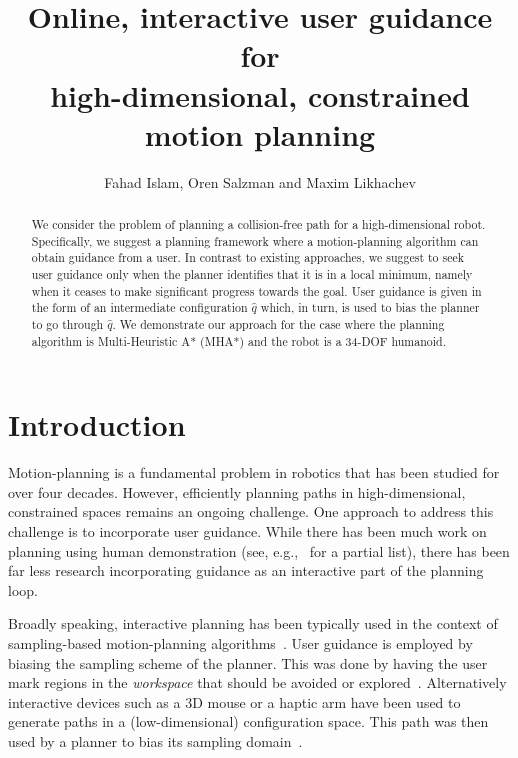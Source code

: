 \documentclass[conference]{IEEEtran}
\begin{document}
\title{	Online, interactive user guidance for \\
		high-dimensional, constrained motion planning }

\author{Fahad Islam, Oren Salzman and Maxim Likhachev}


\maketitle
\thispagestyle{empty}
\pagestyle{empty}



\begin{abstract}
We consider the problem of planning a collision-free path for a high-dimensional robot.
Specifically, we suggest a planning framework where a motion-planning algorithm can obtain guidance from a user.
In contrast to existing approaches, we suggest to seek user guidance only when the planner identifies that it is in a local minimum, namely when it ceases to make significant progress towards the goal.
User guidance is given in the form of an intermediate configuration $\hat{q}$ which, in turn, is used to bias the planner to go through $\hat{q}$.
We demonstrate our approach for the case where the planning algorithm is Multi-Heuristic A* (MHA*) and the robot is a 34-DOF humanoid.
\end{abstract}

\IEEEpeerreviewmaketitle

\section{Introduction}
\label{sec:intro}

Motion-planning is a fundamental problem in robotics that has been studied for over four decades. 
However, efficiently planning paths in high-dimensional, constrained spaces remains an ongoing challenge.
One approach to address this challenge is to incorporate user guidance.
While there has been much work on planning using human demonstration 
(see, e.g.,~\cite{HS16, PHCL16, SHLA16, YA17} for a partial list), 
there has been far less research incorporating guidance as an interactive part of the planning loop.

Broadly speaking, interactive planning has been typically used in the context of sampling-based motion-planning algorithms~\cite{L06}.
User guidance is employed by biasing the sampling scheme of the planner.
This was done by having the user mark regions in the \emph{workspace} that should be avoided or 
explored~\cite{DSJA14}.
Alternatively interactive devices such as a 3D mouse or a haptic arm have been used to generate paths in a (low-dimensional) configuration space. This path was then used by a planner to bias its 
sampling domain~\cite{BTFF16, FTF09, TFF12}.
\end{document}
